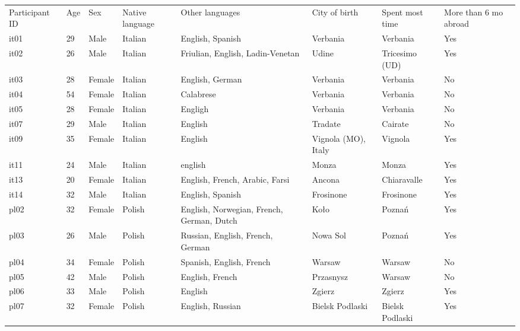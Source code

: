 \documentclass[]{JASAnew}
\begin{document}
\begin{table}[]
\begin{tabular}{llllllll}
Participant ID & Age & Sex    & Native language & Other languages & City of birth & Spent most time & More than 6 mo abroad \\
it01 & 29 & Male   & Italian & English, Spanish                          & Verbania            & Verbania        & Yes \\
it02 & 26 & Male   & Italian & Friulian, English, Ladin-Venetan          & Udine               & Tricesimo (UD)  & Yes \\
it03 & 28 & Female & Italian & English, German                           & Verbania            & Verbania        & No  \\
it04 & 54 & Female & Italian & Calabrese                                 & Verbania            & Verbania        & No  \\
it05 & 28 & Female & Italian & Engligh                                   & Verbania            & Verbania        & No  \\
it07 & 29 & Male   & Italian & English                                   & Tradate             & Cairate         & No  \\
it09 & 35 & Female & Italian & English                                   & Vignola (MO), Italy & Vignola         & Yes \\
it11 & 24 & Male   & Italian & english                                   & Monza               & Monza           & Yes \\
it13 & 20 & Female & Italian & English, French, Arabic, Farsi            & Ancona              & Chiaravalle     & Yes \\
it14 & 32 & Male & Italian & English, Spanish & Frosinone & Frosinone & Yes \\
pl02 & 32 & Female & Polish  & English, Norwegian, French, German, Dutch & Koło                & Poznań          & Yes \\
pl03 & 26 & Male   & Polish  & Russian, English, French, German          & Nowa Sol            & Poznań          & Yes \\
pl04 & 34 & Female & Polish  & Spanish, English, French                  & Warsaw              & Warsaw          & No  \\
pl05 & 42 & Male   & Polish  & English, French                           & Przasnysz           & Warsaw        & No  \\
pl06 & 33 & Male   & Polish  & English                                   & Zgierz              & Zgierz          & Yes \\
pl07 & 32 & Female & Polish  & English, Russian                          & Bielsk Podlaski     & Bielsk Podlaski & Yes
\end{tabular}
\end{table}
\end{document}
